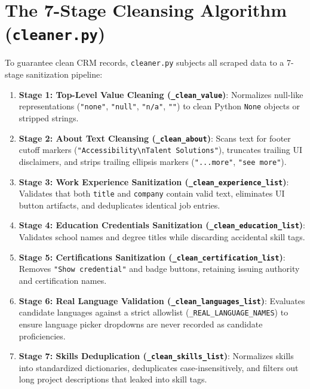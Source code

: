 \documentclass[11pt,a4paper]{report}
\begin{document}
\section{The 7-Stage Cleansing Algorithm (\texttt{cleaner.py})}
To guarantee clean CRM records, \texttt{cleaner.py} subjects all scraped data to a 7-stage sanitization pipeline:
\begin{enumerate}[leftmargin=*]
    \item \textbf{Stage 1: Top-Level Value Cleaning (\texttt{\_clean\_value})}: Normalizes null-like representations (\texttt{"none"}, \texttt{"null"}, \texttt{"n/a"}, \texttt{""}) to clean Python \texttt{None} objects or stripped strings.
    \item \textbf{Stage 2: About Text Cleansing (\texttt{\_clean\_about})}: Scans text for footer cutoff markers (\texttt{"Accessibility\textbackslash nTalent Solutions"}), truncates trailing UI disclaimers, and strips trailing ellipsis markers (\texttt{"...more"}, \texttt{"see more"}).
    \item \textbf{Stage 3: Work Experience Sanitization (\texttt{\_clean\_experience\_list})}: Validates that both \texttt{title} and \texttt{company} contain valid text, eliminates UI button artifacts, and deduplicates identical job entries.
    \item \textbf{Stage 4: Education Credentials Sanitization (\texttt{\_clean\_education\_list})}: Validates school names and degree titles while discarding accidental skill tags.
    \item \textbf{Stage 5: Certifications Sanitization (\texttt{\_clean\_certification\_list})}: Removes \texttt{"Show credential"} and badge buttons, retaining issuing authority and certification names.
    \item \textbf{Stage 6: Real Language Validation (\texttt{\_clean\_languages\_list})}: Evaluates candidate languages against a strict allowlist (\texttt{\_REAL\_LANGUAGE\_NAMES}) to ensure language picker dropdowns are never recorded as candidate proficiencies.
    \item \textbf{Stage 7: Skills Deduplication (\texttt{\_clean\_skills\_list})}: Normalizes skills into standardized dictionaries, deduplicates case-insensitively, and filters out long project descriptions that leaked into skill tags.
\end{enumerate}
\end{document}
